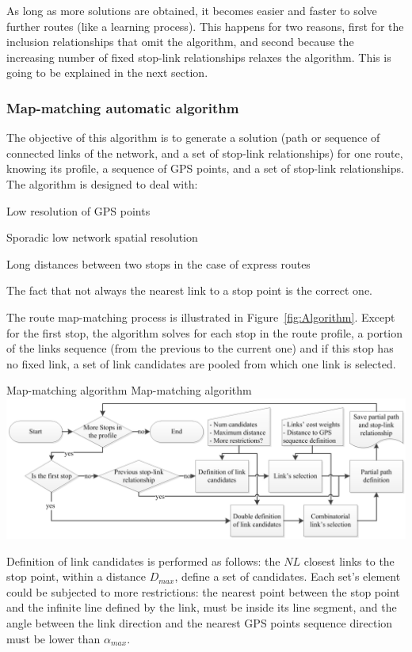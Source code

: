 As long as more solutions are obtained, it becomes easier and faster to solve further routes (like a learning process). This happens for two reasons, first for the inclusion relationships that omit the algorithm, and second because the increasing number of fixed stop-link relationships relaxes the algorithm. This is going to be explained in the next section.

\subsubsection{Map-matching automatic algorithm}
The objective of this algorithm is to generate a solution (path or sequence of connected links of the network, and a set of stop-link relationships) for one route, knowing its profile, a sequence of GPS points, and a set of stop-link relationships. The algorithm is designed to deal with:
%
\begin{compactitem}
\item	Low resolution of GPS points
\item	Sporadic low network spatial resolution
\item	Long distances between two stops in the case of express routes
\item	The fact that not always the nearest link to a stop point is the correct one.
\end{compactitem}

The route map-matching process is illustrated in Figure~\ref{fig:Algorithm}. Except for the first stop, the algorithm solves for each stop in the route profile, a portion of the links sequence (from the previous to the current one) and if this stop has no fixed link, a set of link candidates are pooled from which one link is selected.

\createfigure
{Map-matching algorithm}
{Map-matching algorithm}
{\label{fig:Algorithm}}
{\includegraphics[width=1.0\textwidth]{extending/figures/semiAuto/Algorithm.png}}
{}

Definition of link candidates is performed as follows: the $NL$ closest links to the stop point, within a distance $D_{max}$, define a set of candidates. Each set's element could be subjected to more restrictions: the nearest point between the stop point and the infinite line defined by the link, must be inside its line segment, and the angle between the link direction and the nearest GPS points sequence direction must be lower than $\alpha_{max}$.

